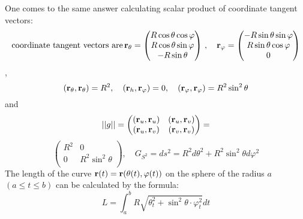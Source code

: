 \documentclass[12pt]{article}
\theoremstyle{theorem}
\numberwithin{equation}{section}
\begin{document}
      
                     
      One comes to the same answer calculating scalar product of coordinate tangent vectors:
  \begin{equation*}\label{ca}
\hbox{coordinate tangent vectors are}\,
  {\bf r}_\theta=\begin{pmatrix}
        R\cos\theta\cos\varphi\\
        R\cos\theta\sin\varphi\\
        -R\sin\theta\\
   \end{pmatrix}
     \,,
\quad
  {\bf r}_\varphi=\begin{pmatrix}
        -R\sin\theta\sin\varphi\\
        R\sin\theta\cos\varphi\\
          0\\
   \end{pmatrix}
 \end{equation*},
            $$
     ({\bf r}_\theta,{\bf r}_\theta)=R^2,\quad
     ({\bf r}_h,{\bf r}_\varphi)=0,\quad
     ({\bf r}_\varphi,{\bf r}_\varphi)=R^2\sin^2\theta
            $$
and
\begin{equation*}\label{formula forfirstform3*}
   ||g||=
   \begin{pmatrix}
   ({\bf r}_u,{\bf r}_u) & ({\bf r}_u,{\bf r}_v) \\
   ({\bf r}_u,{\bf r}_v) & ({\bf r}_v,{\bf r}_v) \\
   \end{pmatrix}=
\end{equation*}
\begin{equation*}\label{formula forfirstformsphere}
   \begin{pmatrix}
   R^2 & 0 \\
   0&  R^2\sin^2\theta \\
   \end{pmatrix}, \quad
   G_{S^2}=ds^2=R^2d\theta^2+R^2\sin^2\theta d\varphi^2
\end{equation*}
  The length of the curve ${\bf r}(t)={\bf r} (\theta(t), \varphi(t))$ on the
  sphere of the radius $a$
    $(a\leq t\leq b)$
  can be calculated by the formula:
               \begin{equation}
             L=\int_a^b
             R\sqrt{\theta_t^2+\sin^2\theta\cdot \varphi_t^2}dt
               \end{equation}
\end{document}
